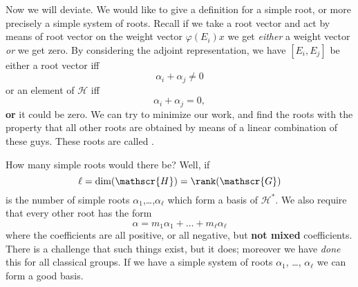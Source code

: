 Now we will deviate. We would like to give a definition for a
simple root, or more precisely a simple system of roots. Recall
if we take a root vector and act by means of root vector on the
weight vector $\varphi(E_{i})x$ we get \emph{either} a weight
vector \emph{or} we get zero. By considering the adjoint
representation, we have $[E_{i},E_{j}]$ be either a root vector
iff
\begin{equation}
\alpha_{i}+\alpha_{j}\not=0
\end{equation}
or an element of $\mathscr{H}$ iff
\begin{equation}
\alpha_{i}+\alpha_{j}=0,
\end{equation}
\textbf{or} it could be zero. We can try to minimize our work,
and find the roots with the property that all other roots are
obtained by means of a linear combination of these guys. These
roots are called .

How many simple roots would there be? Well, if 
\begin{equation}
\ell=\dim(\mathscr{H})=\rank(\mathscr{G})
\end{equation}
is the number of simple roots $\alpha_{1}$,\dots,$\alpha_{\ell}$
which form a basis of $\mathscr{H}^{*}$. We also require that
every other root has the form
\begin{equation}
\alpha = m_{1}\alpha_{1}+\dots+m_{\ell}\alpha_{\ell}
\end{equation}
where the coefficients are all positive, or all negative, but
\textbf{not mixed} coefficients. There is a challenge that such
things exist, but it does; moreover we have \emph{done} this for
all classical groups. If we have a simple system of roots
$\alpha_{1}$, \dots, $\alpha_{\ell}$ we can form a good
basis. 

